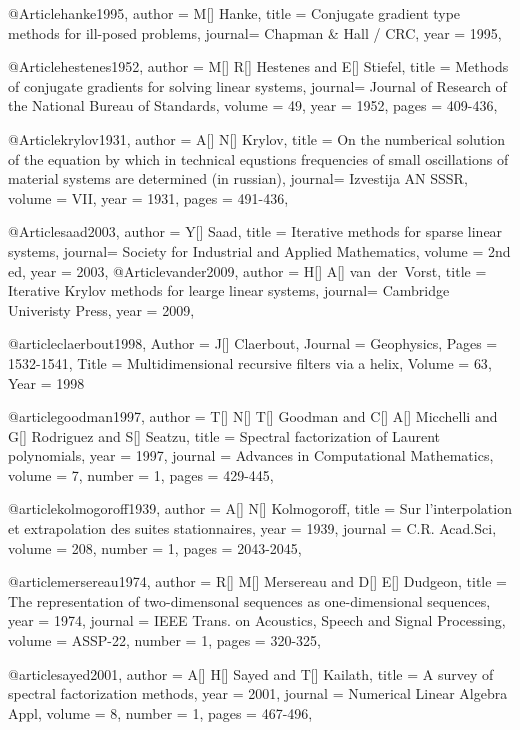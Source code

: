 {@Article{hanke1995,
  author = 	 {M[] Hanke},
  title  = 	 {Conjugate gradient type methods for ill-posed problems},
  journal= 	 {Chapman \& Hall / CRC},
  year   = 	 1995,
}

@Article{hestenes1952,
  author = 	 {M[] R[] Hestenes and E[] Stiefel},
  title  = 	 {Methods of conjugate gradients for solving linear systems},
  journal= 	 {Journal of Research of the National Bureau of Standards},
  volume =	 {49},
  year   = 	 1952,
  pages = 	 409-436,
}

@Article{krylov1931,
  author = 	 {A[] N[] Krylov},
  title  = 	 {On the numberical solution of the equation by which in technical equstions frequencies of small oscillations of material systems are determined (in russian)},
  journal= 	 {Izvestija AN SSSR},
  volume =	 {VII},
  year   = 	 1931,
  pages = 491-436,
}

@Article{saad2003,
  author = 	 {Y[] Saad},
  title  = 	 {Iterative methods for sparse linear systems},
  journal= 	 {Society for Industrial and Applied Mathematics},
  volume =	 {2nd ed},
  year   = 	 2003,
}
@Article{vander2009,
  author = 	 {H[] A[] van~der~Vorst},
  title  = 	 {Iterative Krylov methods for learge linear systems},
  journal= 	 {Cambridge Univeristy Press},
  year   = 	 2009,
}


@article{claerbout1998,
	Author = {J[] Claerbout},
	Journal = {Geophysics},
	Pages = {1532-1541},
	Title = {Multidimensional recursive filters via a helix},
	Volume = {63},
	Year = {1998}}


@article{goodman1997,
  author =	 {T[] N[] T[] Goodman and C[] A[] Micchelli and G[] Rodriguez and S[] Seatzu},
  title =	 {Spectral factorization of Laurent polynomials},
  year =	 1997,
  journal =	 {Advances in Computational Mathematics},
  volume =	 7,
  number =	 1,
  pages =	 {429-445},
}

@article{kolmogoroff1939,
  author =	 {A[] N[] Kolmogoroff},
  title =	 {Sur l'interpolation et extrapolation des suites stationnaires},
  year =	 1939,
  journal =	 {C.R. Acad.Sci},
  volume =	 208,
  number =	 1,
  pages =	 {2043-2045},
}

@article{mersereau1974,
  author =	 {R[] M[] Mersereau and D[] E[] Dudgeon},
  title =	 {The representation of two-dimensonal sequences as one-dimensional sequences},
  year =	 1974,
  journal =	 {IEEE Trans. on Acoustics, Speech and Signal Processing},
  volume =	 ASSP-22,
  number =	 1,
  pages =	 {320-325},
}

@article{sayed2001,
  author =	 {A[] H[] Sayed and T[] Kailath},
  title =	 {A survey of spectral factorization methods},
  year =	 2001,
  journal =	 {Numerical Linear Algebra Appl},
  volume =	 8,
  number =	 1,
  pages =	 {467-496},
}

}
